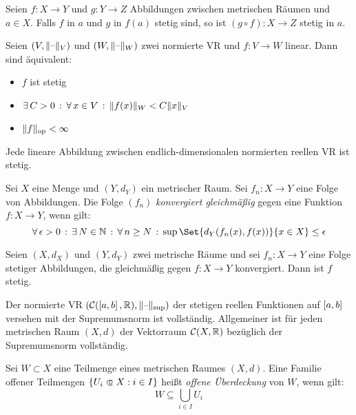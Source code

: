 \documentclass{cheat-sheet}
\begin{document}
\begin{satz}
Seien $f : X \to Y$ und $g : Y \to Z$ Abbildungen zwischen metrischen Räumen und $a \in X$. Falls $f$ in $a$ und $g$ in $f(a)$ stetig sind, so ist $(g \circ f) : X \to Z$ stetig in $a$.
\end{satz}


\begin{satz}
Seien $(V, \lVert\text{--}\rVert_V)$ und $(W, \lVert\text{--}\rVert_W)$ zwei normierte VR und $f : V \to W$ linear. Dann sind äquivalent:
\begin{itemize}
  \item $f$ ist stetig
  \item $\exists \, {C > 0} \,:\, \forall \, {x \in V} \,:\, \lVert f(x)\rVert_W < C \lVert x\rVert_V$
  \item $\lVert f\rVert_\text{op} < \infty$
\end{itemize}
\end{satz}

\begin{kor}
Jede lineare Abbildung zwischen endlich-dimensionalen normierten reellen VR ist stetig.
\end{kor}

\begin{defn}
Sei $X$ eine Menge und $(Y, d_Y)$ ein metrischer Raum. Sei $f_n : X \to Y$ eine Folge von Abbildungen. Die Folge $(f_n)$ \emph{konvergiert gleichmäßig} gegen eine Funktion $f : X \to Y$, wenn gilt:
\[ \fa{\epsilon > 0} \ex{N \in \N} \fa{n \ge N} \sup \Set{d_Y(f_n(x), f(x))}{x \in X} \le \epsilon \]
\end{defn}

\begin{satz}
Seien $(X, d_X)$ und $(Y, d_Y)$ zwei metrische Räume und sei $f_n : X \to Y$ eine Folge stetiger Abbildungen, die gleichmäßig gegen $f : X \to Y$ konvergiert. Dann ist $f$ stetig.
\end{satz}

\begin{kor}
Der normierte VR $(\mathcal{C}(\left[ a, b \right], \mathbb{R}), \lVert\text{--}\rVert_{\sup})$ der stetigen reellen Funktionen auf $\left[ a, b \right]$ versehen mit der Supremumsnorm ist vollständig. Allgemeiner ist für jeden metrischen Raum $(X, d)$ der Vektorraum $\mathcal{C}(X, \mathbb{R})$ bezüglich der Supremumsnorm vollständig.
\end{kor}

\begin{defn}
Sei $W \subset X$ eine Teilmenge eines metrischen Raumes $(X, d)$. Eine Familie offener Teilmengen $\{ U_i \opn X : i \in I \}$ heißt \emph{offene Überdeckung} von $W$, wenn gilt:
\[ W \subseteq \bigcup_{i \in I} U_i \]
\end{defn}
\end{document}
